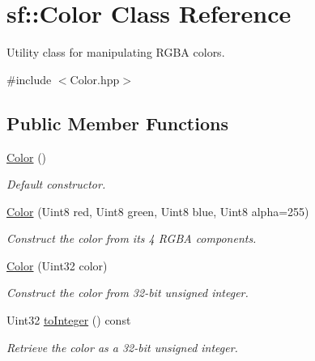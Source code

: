 \hypertarget{classsf_1_1_color}{}\section{sf\+:\+:Color Class Reference}
\label{classsf_1_1_color}


Utility class for manipulating R\+G\+BA colors.  




{\ttfamily \#include $<$Color.\+hpp$>$}

\subsection*{Public Member Functions}
\begin{DoxyCompactItemize}
\item 
\hyperlink{classsf_1_1_color_ac2eb4393fb11ad3fa3ccf34e92fe08e4}{Color} ()
\begin{DoxyCompactList}\small\item\em Default constructor. \end{DoxyCompactList}\item 
\hyperlink{classsf_1_1_color_ac791dc61be4c60baac50fe700f1c9850}{Color} (Uint8 red, Uint8 green, Uint8 blue, Uint8 alpha=255)
\begin{DoxyCompactList}\small\item\em Construct the color from its 4 R\+G\+BA components. \end{DoxyCompactList}\item 
\hyperlink{classsf_1_1_color_a5449f4b2b9a78230d40ce2c223c9ab2e}{Color} (Uint32 color)
\begin{DoxyCompactList}\small\item\em Construct the color from 32-\/bit unsigned integer. \end{DoxyCompactList}\item 
Uint32 \hyperlink{classsf_1_1_color_abb46e6942c4fe0d221574a46e642caa9}{to\+Integer} () const
\begin{DoxyCompactList}\small\item\em Retrieve the color as a 32-\/bit unsigned integer. \end{DoxyCompactList}\end{DoxyCompactItemize}
